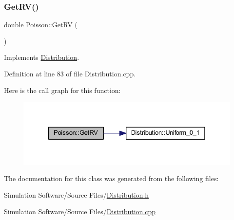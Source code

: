 \subsubsection{\texorpdfstring{Get\+R\+V()}{GetRV()}}
{\footnotesize\ttfamily double Poisson\+::\+Get\+RV (\begin{DoxyParamCaption}{ }\end{DoxyParamCaption})\hspace{0.3cm}{\ttfamily [virtual]}}



Implements \hyperlink{class_distribution_a63b433850d7b47d84eb69448f7916719}{Distribution}.



Definition at line 83 of file Distribution.\+cpp.

Here is the call graph for this function\+:\nopagebreak
\begin{figure}[H]
\begin{center}
\leavevmode
\includegraphics[width=328pt]{class_poisson_a068964aa05df4051b23a84d71529fb69_cgraph}
\end{center}
\end{figure}


The documentation for this class was generated from the following files\+:\begin{DoxyCompactItemize}
\item 
Simulation Software/\+Source Files/\hyperlink{_distribution_8h}{Distribution.\+h}\item 
Simulation Software/\+Source Files/\hyperlink{_distribution_8cpp}{Distribution.\+cpp}\end{DoxyCompactItemize}
